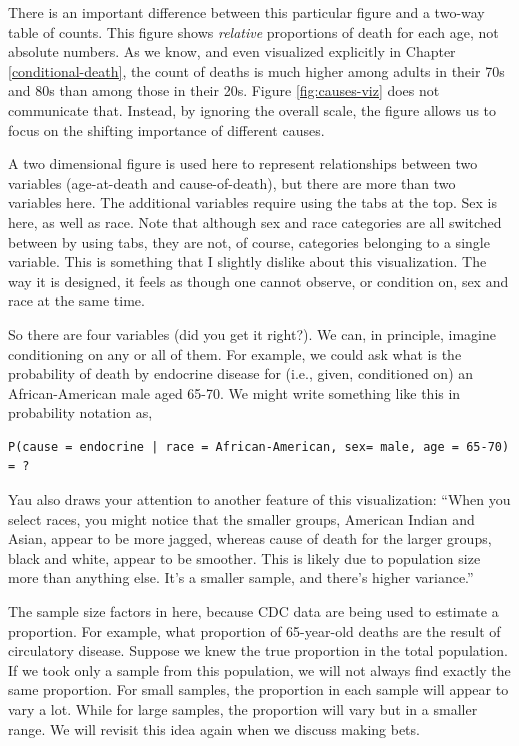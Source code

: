 \documentclass[openany]{book}
\begin{document}
There is an important difference between this particular figure and a two-way table of counts. This figure shows \emph{relative} proportions of death for each age, not absolute numbers. As we know, and even visualized explicitly in Chapter \ref{conditional-death}, the count of deaths is much higher among adults in their 70s and 80s than among those in their 20s. Figure \ref{fig:causes-viz} does not communicate that. Instead, by ignoring the overall scale, the figure allows us to focus on the shifting importance of different causes.

A two dimensional figure is used here to represent relationships between two variables (age-at-death and cause-of-death), but there are more than two variables here. The additional variables require using the tabs at the top. Sex is here, as well as race. Note that although sex and race categories are all switched between by using tabs, they are not, of course, categories belonging to a single variable. This is something that I slightly dislike about this visualization. The way it is designed, it feels as though one cannot observe, or condition on, sex and race at the same time.

So there are four variables (did you get it right?). We can, in principle, imagine conditioning on any or all of them. For example, we could ask what is the probability of death by endocrine disease for (i.e., given, conditioned on) an African-American male aged 65-70. We might write something like this in probability notation as,

\begin{verbatim}
P(cause = endocrine | race = African-American, sex= male, age = 65-70) = ?
\end{verbatim}

Yau also draws your attention to another feature of this visualization: ``When you select races, you might notice that the smaller groups, American Indian and Asian, appear to be more jagged, whereas cause of death for the larger groups, black and white, appear to be smoother. This is likely due to population size more than anything else. It's a smaller sample, and there's higher variance.''

The sample size factors in here, because CDC data are being used to estimate a proportion. For example, what proportion of 65-year-old deaths are the result of circulatory disease. Suppose we knew the true proportion in the total population. If we took only a sample from this population, we will not always find exactly the same proportion. For small samples, the proportion in each sample will appear to vary a lot. While for large samples, the proportion will vary but in a smaller range. We will revisit this idea again when we discuss making bets.
\end{document}
